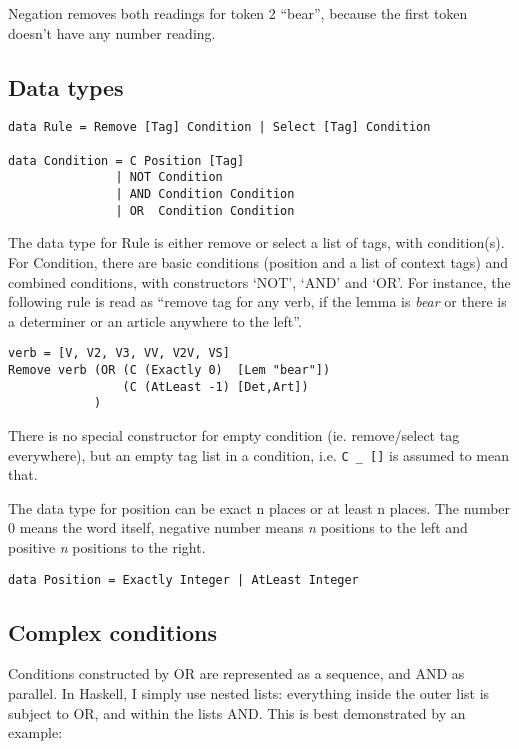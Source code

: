 \documentclass[a4paper, 11pt]{article}
\begin{document}
Negation removes both readings for token 2 ``bear'', because the first
token doesn't have any number reading.

\subsection{Data types}

\begin{lstlisting}
data Rule = Remove [Tag] Condition | Select [Tag] Condition

data Condition = C Position [Tag]
               | NOT Condition
               | AND Condition Condition
               | OR  Condition Condition 
\end{lstlisting}

The data type for Rule is either remove or select a list of tags, with condition(s).
For Condition, there are basic conditions (position and a list of context tags) and combined conditions, with constructors `NOT', `AND' and `OR'. For instance, the following rule is read as ``remove tag for any verb, if the lemma is \emph{bear} or there is a determiner or an article anywhere to the left''.

\begin{lstlisting}
verb = [V, V2, V3, VV, V2V, VS]
Remove verb (OR (C (Exactly 0)  [Lem "bear"])
                (C (AtLeast -1) [Det,Art])
            )
\end{lstlisting}

There is no special constructor for empty condition (ie. remove/select tag everywhere), but an empty tag list in a condition, i.e. \texttt{C \_ []} is assumed to mean that.

The data type for position can be exact n places or at least n places. The number 0 means the word itself, negative number means \emph{n} positions to the left and positive \emph{n} positions to the right.

\begin{lstlisting}
data Position = Exactly Integer | AtLeast Integer
 \end{lstlisting}

\subsection{Complex conditions}
Conditions constructed by OR are represented as a sequence, and AND as
parallel. In Haskell, I simply use nested lists: everything inside the
outer list is subject to OR, and within the lists AND. This is best
demonstrated by an example:
\end{document}
